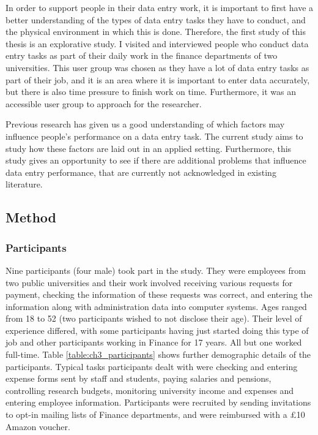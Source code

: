 \documentclass[11pt,oneside]{report}
\begin{document}
In order to support people in their data entry work, it is important to first have a better understanding of the types of data entry tasks they have to conduct, and the physical environment in which this is done. Therefore, the first study of this thesis is an explorative study. I visited and interviewed people who conduct data entry tasks as part of their daily work in the finance departments of two universities. This user group was chosen as they have a lot of data entry tasks as part of their job, and it is an area where it is important to enter data accurately, but there is also time pressure to finish work on time. Furthermore, it was an accessible user group to approach for the researcher.

Previous research has given us a good understanding of which factors may influence people's performance on a data entry task. The current study aims to study how these factors are laid out in an applied setting. Furthermore, this study gives an opportunity to see if there are additional problems that influence data entry performance, that are currently not acknowledged in existing literature. 

\subsection{Method}
\subsubsection{Participants}
Nine participants (four male) took part in the study. They were employees from two public universities and their work involved receiving various requests for payment, checking the information of these requests was correct, and entering the information along with administration data into computer systems. Ages ranged from 18 to 52 (two participants wished to not disclose their age). Their level of experience differed, with some participants having just started doing this type of job and other participants working in Finance for 17 years. All but one worked full-time. Table \ref{table:ch3_participants} shows further demographic details of the participants. Typical tasks participants dealt with were checking and entering expense forms sent by staff and students, paying salaries and pensions, controlling research budgets, monitoring university income and expenses and entering employee information. Participants were recruited by sending invitations to opt-in mailing lists of Finance departments, and were reimbursed with a \pounds10 Amazon voucher.
\end{document}
